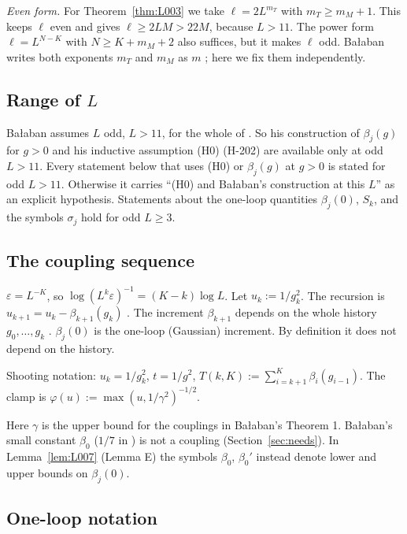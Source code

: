 \emph{Even form.} For Theorem~\ref{thm:L003} we take $\ell=2L^{m_T}$ with $m_T\ge m_M+1$. This keeps $\ell$ even and gives $\ell\ge2LM>22M$, because $L>11$. The power form $\ell=L^{N-K}$ with $N\ge K+m_M+2$ also suffices, but it makes $\ell$ odd. Ba{\l}aban writes both exponents $m_T$ and $m_M$ as $m$ \cite{balaban109}; here we fix them independently.

\subsection{Range of $L$}\label{sec:rangeL}

Ba{\l}aban assumes $L$ odd, $L>11$, for the whole of \cite[pp.~251--252]{balaban109}. So his construction of $\beta_j(g)$ for $g>0$ and his inductive assumption (H0) (H-202) are available only at odd $L>11$. Every statement below that uses (H0) or $\beta_j(g)$ at $g>0$ is stated for odd $L>11$. Otherwise it carries ``(H0) and Ba{\l}aban's construction at this $L$'' as an explicit hypothesis. Statements about the one-loop quantities $\beta_j(0)$, $S_k$, and the symbols $\sigma_j$ hold for odd $L\ge 3$.

\subsection{The coupling sequence}\label{sec:couplings}

$\varepsilon = L^{-K}$, so $\log(L^k\varepsilon)^{-1} = (K-k)\log L$. Let $u_k := 1/g_k^2$. The recursion is $u_{k+1} = u_k - \beta_{k+1}(g_k)$ \cite[(0.18), (0.20)]{balaban109}. The increment $\beta_{k+1}$ depends on the whole history $g_0,\dots,g_k$ \cite[p.~298]{balaban109}. $\beta_j(0)$ is the one-loop (Gaussian) increment. By definition it does not depend on the history.

Shooting notation: $u_k = 1/g_k^2$, $t = 1/g^2$, $T(k,K) := \sum_{i=k+1}^{K}\beta_i(g_{i-1})$. The clamp is $\varphi(u) := \max(u, 1/\gamma^2)^{-1/2}$.

Here $\gamma$ is the upper bound for the couplings in Ba{\l}aban's Theorem 1. Ba{\l}aban's small constant $\beta_0$ ($1/7$ in \cite[p.~389]{balaban122b}) is not a coupling (Section~\ref{sec:needs}). In Lemma~\ref{lem:L007} (Lemma E) the symbols $\beta_0$, $\beta_0'$ instead denote lower and upper bounds on $\beta_j(0)$.

\subsection{One-loop notation}\label{sec:oneloopnotation}

